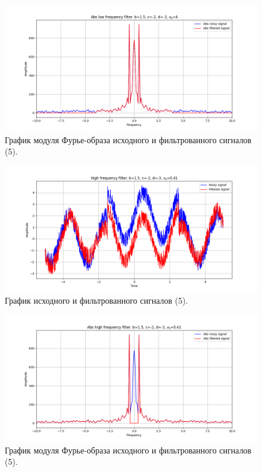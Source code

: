 \documentclass[a4paper, 12pt]{article}
\begin{document}
    \begin{figure}[!htb]
        \centering
        \includegraphics[scale=0.48]{5_1_abs_u_U_nospec.png}
        \captionsetup{skip=0pt}
        \caption{График модуля Фурье-образа исходного и фильтрованного сигналов (5).}
        \label{fig:fig04}
    \end{figure}
    \newpage
    \begin{figure}[!htb]
        \centering
        \includegraphics[scale=0.48]{5_2_u_flt_u_nospec.png}
        \captionsetup{skip=0pt}
        \caption{График исходного и фильтрованного сигналов (5).}
        \label{fig:fig05}
    \end{figure}
    \begin{figure}[!htb]
        \centering
        \includegraphics[scale=0.48]{5_2_abs_u_U_nospec.png}
        \captionsetup{skip=0pt}
        \caption{График модуля Фурье-образа исходного и фильтрованного сигналов (5).}
        \label{fig:fig06}
    \end{figure}
\end{document}
